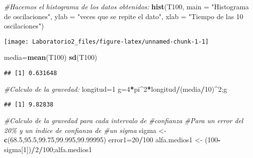 \documentclass[
]{article}
\newenvironment{Shaded}{\begin{snugshade}}{\end{snugshade}}
\newcommand{\AttributeTok}[1]{\textcolor[rgb]{0.13,0.29,0.53}{#1}}
\newcommand{\CommentTok}[1]{\textcolor[rgb]{0.56,0.35,0.01}{\textit{#1}}}
\newcommand{\DecValTok}[1]{\textcolor[rgb]{0.00,0.00,0.81}{#1}}
\newcommand{\FloatTok}[1]{\textcolor[rgb]{0.00,0.00,0.81}{#1}}
\newcommand{\FunctionTok}[1]{\textcolor[rgb]{0.13,0.29,0.53}{\textbf{#1}}}
\newcommand{\NormalTok}[1]{#1}
\newcommand{\OtherTok}[1]{\textcolor[rgb]{0.56,0.35,0.01}{#1}}
\newcommand{\SpecialCharTok}[1]{\textcolor[rgb]{0.81,0.36,0.00}{\textbf{#1}}}
\newcommand{\StringTok}[1]{\textcolor[rgb]{0.31,0.60,0.02}{#1}}
\begin{document}
\begin{Shaded}
\begin{Highlighting}[]
\CommentTok{\#Hacemos el histograma de los datos obtenidos:}
\FunctionTok{hist}\NormalTok{(T100, }\AttributeTok{main =} \StringTok{"Histograma de oscilaciones"}\NormalTok{, }\AttributeTok{ylab =} \StringTok{"veces que se repite el dato"}\NormalTok{, }\AttributeTok{xlab =} \StringTok{"Tiempo de las 10 oscilaciones"}\NormalTok{)}
\end{Highlighting}
\end{Shaded}

\begin{center}\texttt{[image: Laboratorio2\_files/figure-latex/unnamed-chunk-1-1]} \end{center}

\begin{Shaded}
\begin{Highlighting}[]
\NormalTok{media}\OtherTok{=}\FunctionTok{mean}\NormalTok{(T100)}
\FunctionTok{sd}\NormalTok{(T100)}
\end{Highlighting}
\end{Shaded}

\begin{verbatim}
## [1] 0.631648
\end{verbatim}

\begin{Shaded}
\begin{Highlighting}[]
\CommentTok{\#Calculo de la gravedad:}
\NormalTok{longitud}\OtherTok{=}\DecValTok{1}
\NormalTok{g}\OtherTok{=}\DecValTok{4}\SpecialCharTok{*}\NormalTok{pi}\SpecialCharTok{\^{}}\DecValTok{2}\SpecialCharTok{*}\NormalTok{longitud}\SpecialCharTok{/}\NormalTok{(media}\SpecialCharTok{/}\DecValTok{10}\NormalTok{)}\SpecialCharTok{\^{}}\DecValTok{2}\NormalTok{;g}
\end{Highlighting}
\end{Shaded}

\begin{verbatim}
## [1] 9.82838
\end{verbatim}

\begin{Shaded}
\begin{Highlighting}[]
\CommentTok{\#Calculo de la gravedad para cada intervalo de }
\CommentTok{\#confianza}
\CommentTok{\#Para un error del 20\% y un indice de confianza de}
\CommentTok{\#un sigma}
\NormalTok{sigma }\OtherTok{\textless{}{-}} \FunctionTok{c}\NormalTok{(}\FloatTok{68.5}\NormalTok{,}\FloatTok{95.5}\NormalTok{,}\FloatTok{99.75}\NormalTok{,}\FloatTok{99.995}\NormalTok{,}\FloatTok{99.99995}\NormalTok{)}
\NormalTok{error1}\OtherTok{=}\DecValTok{20}\SpecialCharTok{/}\DecValTok{100}
\NormalTok{alfa.medios1 }\OtherTok{\textless{}{-}}\NormalTok{ (}\DecValTok{100}\SpecialCharTok{{-}}\NormalTok{sigma[}\DecValTok{1}\NormalTok{])}\SpecialCharTok{/}\DecValTok{2}\SpecialCharTok{/}\DecValTok{100}\NormalTok{;alfa.medios1}
\end{Highlighting}
\end{Shaded}
\end{document}
